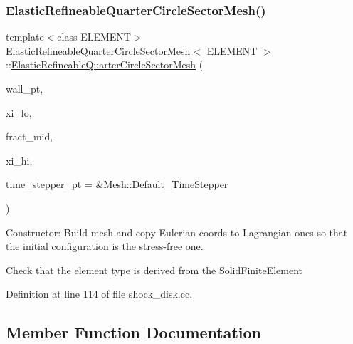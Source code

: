 \subsubsection{\texorpdfstring{Elastic\+Refineable\+Quarter\+Circle\+Sector\+Mesh()}{ElasticRefineableQuarterCircleSectorMesh()}}
{\footnotesize\ttfamily template$<$class E\+L\+E\+M\+E\+NT$>$ \\
\hyperlink{classElasticRefineableQuarterCircleSectorMesh}{Elastic\+Refineable\+Quarter\+Circle\+Sector\+Mesh}$<$ E\+L\+E\+M\+E\+NT $>$\+::\hyperlink{classElasticRefineableQuarterCircleSectorMesh}{Elastic\+Refineable\+Quarter\+Circle\+Sector\+Mesh} (\begin{DoxyParamCaption}\item[{Geom\+Object $\ast$}]{wall\+\_\+pt,  }\item[{const double \&}]{xi\+\_\+lo,  }\item[{const double \&}]{fract\+\_\+mid,  }\item[{const double \&}]{xi\+\_\+hi,  }\item[{Time\+Stepper $\ast$}]{time\+\_\+stepper\+\_\+pt = {\ttfamily \&Mesh\+:\+:Default\+\_\+TimeStepper} }\end{DoxyParamCaption})\hspace{0.3cm}{\ttfamily [inline]}}



Constructor\+: Build mesh and copy Eulerian coords to Lagrangian ones so that the initial configuration is the stress-\/free one. 

Check that the element type is derived from the Solid\+Finite\+Element 

Definition at line 114 of file shock\+\_\+disk.\+cc.



\subsection{Member Function Documentation}
\mbox{\label{classElasticRefineableQuarterCircleSectorMesh_ad9734ea7aee2141079544bb782d3ace1}} 

